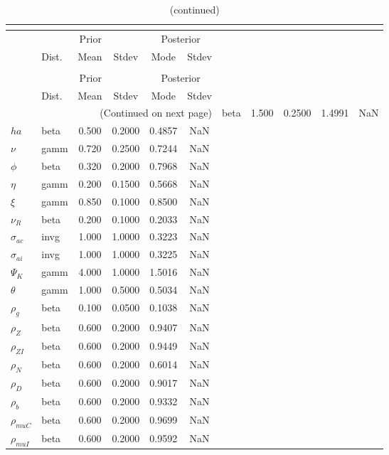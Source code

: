  
\begin{center}
\begin{longtable}{llcccc} 
\caption{Results from posterior maximization (parameters)}\\
 \label{Table:Posterior:1}\\
\toprule 
  & \multicolumn{3}{c}{Prior}  &  \multicolumn{2}{c}{Posterior} \\
  \cmidrule(r{.75em}){2-4} \cmidrule(r{.75em}){5-6}
  & Dist. & Mean  & Stdev & Mode & Stdev \\ 
\midrule \endfirsthead 
\caption{(continued)}\\
 \bottomrule 
  & \multicolumn{3}{c}{Prior}  &  \multicolumn{2}{c}{Posterior} \\
  \cmidrule(r{.75em}){2-4} \cmidrule(r{.75em}){5-6}
  & Dist. & Mean  & Stdev & Mode & Stdev \\ 
\midrule \endhead 
\bottomrule \multicolumn{6}{r}{(Continued on next page)}\endfoot 
\bottomrule\endlastfoot 
${\sigma}$ & beta &   1.500 & 0.2500 &   1.4991 &     NaN \\ 
${ha}$ & beta &   0.500 & 0.2000 &   0.4857 &     NaN \\ 
$\nu$ & gamm &   0.720 & 0.2500 &   0.7244 &     NaN \\ 
${\phi}$ & beta &   0.320 & 0.2000 &   0.7968 &     NaN \\ 
${\eta}$ & gamm &   0.200 & 0.1500 &   0.5668 &     NaN \\ 
$\xi$ & gamm &   0.850 & 0.1000 &   0.8500 &     NaN \\ 
${\nu_R}$ & beta &   0.200 & 0.1000 &   0.2033 &     NaN \\ 
${\sigma_{ac}}$ & invg &   1.000 & 1.0000 &   0.3223 &     NaN \\ 
${\sigma_{ai}}$ & invg &   1.000 & 1.0000 &   0.3225 &     NaN \\ 
${\Psi_{K}}$ & gamm &   4.000 & 1.0000 &   1.5016 &     NaN \\ 
${\theta}$ & gamm &   1.000 & 0.5000 &   0.5034 &     NaN \\ 
${\rho_g}$ & beta &   0.100 & 0.0500 &   0.1038 &     NaN \\ 
${\rho_Z}$ & beta &   0.600 & 0.2000 &   0.9407 &     NaN \\ 
${\rho_{ZI}}$ & beta &   0.600 & 0.2000 &   0.9449 &     NaN \\ 
${\rho_N}$ & beta &   0.600 & 0.2000 &   0.6014 &     NaN \\ 
${\rho_D}$ & beta &   0.600 & 0.2000 &   0.9017 &     NaN \\ 
${\rho_b}$ & beta &   0.600 & 0.2000 &   0.9332 &     NaN \\ 
${\rho_{muC}}$ & beta &   0.600 & 0.2000 &   0.9699 &     NaN \\ 
${\rho_{muI}}$ & beta &   0.600 & 0.2000 &   0.9592 &     NaN \\ 
\end{longtable}
 \end{center}
